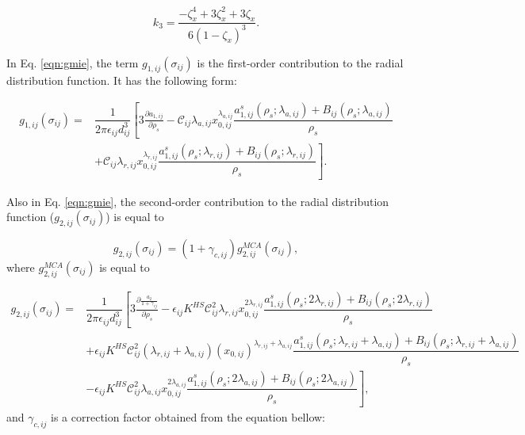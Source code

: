 \documentclass[
	12pt,				%
	openany,			%
	oneside,			%
	a4paper,			%
	english,			%
	brazil				%
	]{abntex2}
\providecommand{\DIFaddbegin}{}
\providecommand{\DIFaddend}{}
\providecommand{\DIFaddbegin}{} %
\providecommand{\DIFaddend}{} %
\begin{document}
\begin{apendicesenv}
\begin{equation}
k_{3} = \frac{-{\zeta}_{x}^{4}+3{\zeta}_{x}^{2}+3{\zeta}_{x}}{6(1-\zeta_{x})^{3}}.
\end{equation}

In Eq. \ref{eqn:gmie}, the term $g_{1,ij}(\sigma_{ij})$ is the first-order contribution to the radial distribution function. It has the following form:

\begin{equation}
\begin{aligned}
g_{1,ij}(\sigma_{ij}) {}=& \dfrac{1}{2 \pi \epsilon_{ij} d _{ij}^{3}} \left[ 3 \frac{\partial a_{1,ij}}{\partial \rho _{s}}   - \mathcal{C}_{ij} \lambda_{a,ij} x_{0,ij}^{\lambda_{a,ij}} \dfrac{a_{1,ij}^{s}(\rho_{s};\lambda_{a,ij})+B_{ij}(\rho_{s};\lambda_{a,ij})}{\rho _{s}} \right. \\
& \left.  + \mathcal{C}_{ij} \lambda_{r,ij} x_{0,ij}^{\lambda_{r,ij}} \dfrac{a_{1,ij}^{s}(\rho_{s};\lambda_{r,ij})+B_{ij}(\rho_{s};\lambda_{r,ij})}{\rho _{s}} \right].
\end{aligned}
\DIFaddbegin \label{eq:g1saft}
\DIFaddend \end{equation} 

Also in Eq. \ref{eqn:gmie}, the second-order contribution to the radial distribution function ($g_{2,ij}(\sigma_{ij})$) is equal to

\begin{equation}
g_{2,ij}(\sigma_{ij}) = (1 + \gamma_{c,ij}) g_{2,ij}^{MCA}(\sigma_{ij}), 
\end{equation}
where $g_{2,ij}^{MCA}(\sigma_{ij})$ is equal to

\begin{equation}
\begin{aligned}
g_{2,ij}(\sigma_{ij}) {}=& \dfrac{1}{2 \pi \epsilon_{ij} d _{ij}^{3}} \left[3 \frac{\partial \frac{a_{2}}{1+\gamma_{ij}}}{\partial \rho _{s}} - \epsilon_{ij} K^{HS} \mathcal{C}_{ij}^{2} \lambda_{r,ij} x_{0,ij}^{2\lambda_{r,ij}} \dfrac{a_{1,ij}^{s}(\rho_{s};2\lambda_{r,ij})+B_{ij}(\rho_{s};2\lambda_{r,ij})}{\rho _{s}} \right. \\
& \left. + \epsilon_{ij} K^{HS} \mathcal{C}_{ij}^{2} (\lambda_{r,ij}+\lambda_{a,ij}) (x_{0,ij})^{\lambda_{r,ij}+\lambda_{a,ij}} \dfrac{a_{1,ij}^{s}(\rho_{s};\lambda_{r,ij}+\lambda_{a,ij})+B_{ij}(\rho_{s};\lambda_{r,ij}+\lambda_{a,ij})}{\rho _{s}} \right. \\
& \left. - \epsilon_{ij} K^{HS} \mathcal{C}_{ij}^{2} \lambda_{a,ij} x_{0,ij}^{2\lambda_{a,ij}} \dfrac{a_{1,ij}^{s}(\rho_{s};2\lambda_{a,ij})+B_{ij}(\rho_{s};2\lambda_{a,ij})}{\rho _{s}}\right],
\end{aligned}
\DIFaddbegin \label{eq:g2saft}
\DIFaddend \end{equation} 
and $\gamma_{c,ij}$ is a correction factor obtained from the equation bellow:


\end{apendicesenv}
\end{document}

